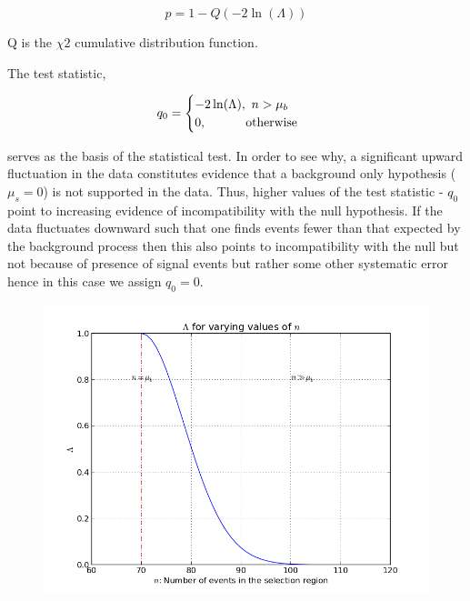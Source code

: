 \documentclass[a4paper,twoside]{report}
\begin{document}
\begin{equation}
p = 1 - Q(-2\ln(\Lambda))
\end{equation}

Q is the $\chi{2}$ cumulative distribution function.

The test statistic, 

\begin{equation}
q_{0} = \begin{cases} -2\ln(\Lambda),  \textrm{   }n > \mu_{b}\\ 0,  \hspace{11mm} \textrm{otherwise }
\end{cases}
\end{equation}

serves as the basis of the statistical test. In order to see why, a significant upward fluctuation in the data constitutes evidence that a background only hypothesis ($\mu_s = 0$) is not supported in the data. Thus, higher values of the test statistic - $q_{0}$ point to increasing evidence of incompatibility with the null hypothesis. If the data fluctuates downward such that one finds events fewer than that expected by the background process then this also points to incompatibility with the null but not because of presence of signal events but rather some other systematic error hence in this case we assign $q_{0} = 0$.

\begin{figure}
\includegraphics[scale=0.6]{images/lambda.png}
\end{figure}
\end{document}
